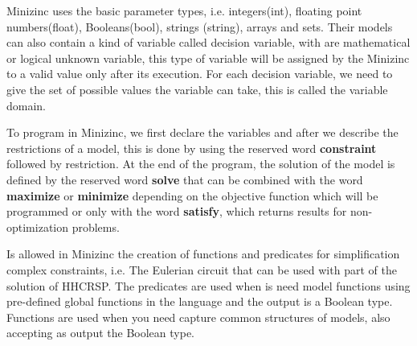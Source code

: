 Minizinc uses the basic parameter types, i.e. integers(int), floating point numbers(float), Booleans(bool), strings (string), arrays and sets. Their models can also contain a kind of variable called decision variable, with are mathematical or logical unknown variable, this type of variable will be assigned by the Minizinc to a valid value only after its execution. For each decision variable, we need to give the set of possible values the variable can take, this is called the variable domain.     

To program in Minizinc, we first declare the variables and after we describe the restrictions of a model, this is done by using the reserved word \textbf{constraint} followed by restriction. At the end of the program, the solution of the model is defined by the reserved word \textbf{solve} that can be combined with the word \textbf{maximize} or \textbf{minimize} depending on the objective function which will be programmed or only with the word \textbf{satisfy}, which returns results for non-optimization problems.

Is allowed in Minizinc the creation of functions and predicates for simplification complex constraints, i.e. The Eulerian circuit that can be used with part of the solution of \ac{HHCRSP}.
The predicates are used when is need model functions using pre-defined global functions in the language and the output is a Boolean type. Functions are used when you need capture common structures of models, also accepting as output the Boolean type.